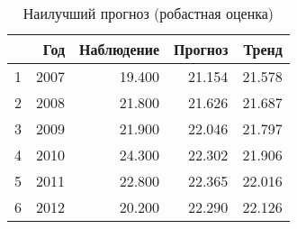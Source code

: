 \begin{table}[ht]
\centering
\begin{tabular}{rrrrr}
  \hline
 & Год & Наблюдение & Прогноз & Тренд \\ 
  \hline
1 & 2007 & 19.400 & 21.154 & 21.578 \\ 
  2 & 2008 & 21.800 & 21.626 & 21.687 \\ 
  3 & 2009 & 21.900 & 22.046 & 21.797 \\ 
  4 & 2010 & 24.300 & 22.302 & 21.906 \\ 
  5 & 2011 & 22.800 & 22.365 & 22.016 \\ 
  6 & 2012 & 20.200 & 22.290 & 22.126 \\ 
   \hline
\end{tabular}
\caption{Наилучший прогноз (робастная оценка)} 
\label{table:robust-best-prediction}
\end{table}
